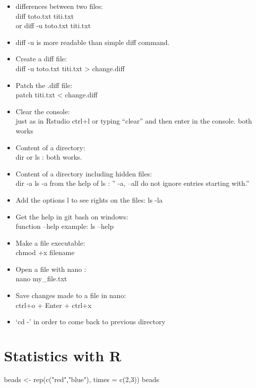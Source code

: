 \documentclass[
]{book}
\newenvironment{Shaded}{\begin{snugshade}}{\end{snugshade}}
\newcommand{\AttributeTok}[1]{\textcolor[rgb]{0.77,0.63,0.00}{#1}}
\newcommand{\DecValTok}[1]{\textcolor[rgb]{0.00,0.00,0.81}{#1}}
\newcommand{\FunctionTok}[1]{\textcolor[rgb]{0.00,0.00,0.00}{#1}}
\newcommand{\NormalTok}[1]{#1}
\newcommand{\OtherTok}[1]{\textcolor[rgb]{0.56,0.35,0.01}{#1}}
\newcommand{\StringTok}[1]{\textcolor[rgb]{0.31,0.60,0.02}{#1}}
\begin{document}
\begin{itemize}
\item
  differences between two files:\\
  diff toto.txt titi.txt\\
  or diff -u toto.txt titi.txt
\item
  diff -u is more readable than simple diff command.
\item
  Create a diff file:\\
  diff -u toto.txt titi.txt \textgreater{} change.diff
\item
  Patch the .diff file:\\
  patch titi.txt \textless{} change.diff
\item
  Clear the console:\\
  just as in Rstudio ctrl+l
  or typing ``clear'' and then enter in the console.
  both works
\item
  Content of a directory:\\
  dir or ls : both works.
\item
  Content of a directory including hidden files:\\
  dir -a
  ls -a
  from the help of ls : '' -a, --all do not ignore entries starting with.''
\item
  Add the options l to see rights on the files:
  ls -la
\item
  Get the help in git bash on windows:\\
  function --help
  example: ls --help
\item
  Make a file executable:\\
  chmod +x filename
\item
  Open a file with nano :\\
  nano my\_file.txt
\item
  Save changes made to a file in nano:\\
  ctrl+o + Enter + ctrl+x
\item
  `cd -' in order to come back to previous directory
\end{itemize}

\hypertarget{statistics-with-r}{%
\chapter{Statistics with R}\label{statistics-with-r}}

\begin{Shaded}
\begin{Highlighting}[]
\NormalTok{beads }\OtherTok{\textless{}{-}} \FunctionTok{rep}\NormalTok{(}\FunctionTok{c}\NormalTok{(}\StringTok{"red"}\NormalTok{,}\StringTok{"blue"}\NormalTok{), }\AttributeTok{times =} \FunctionTok{c}\NormalTok{(}\DecValTok{2}\NormalTok{,}\DecValTok{3}\NormalTok{))}
\NormalTok{beads}
\end{Highlighting}
\end{Shaded}
\end{document}
